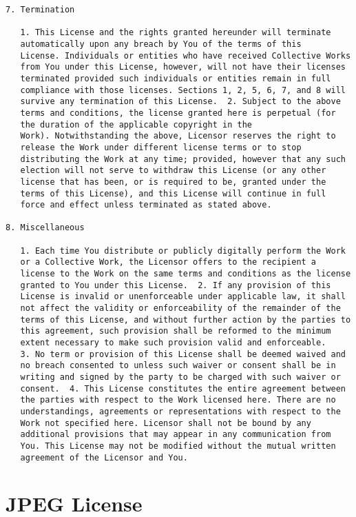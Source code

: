 \begin{lstlisting}[firstnumber=1,]
7. Termination

   1. This License and the rights granted hereunder will terminate
   automatically upon any breach by You of the terms of this
   License. Individuals or entities who have received Collective Works
   from You under this License, however, will not have their licenses
   terminated provided such individuals or entities remain in full
   compliance with those licenses. Sections 1, 2, 5, 6, 7, and 8 will
   survive any termination of this License.  2. Subject to the above
   terms and conditions, the license granted here is perpetual (for
   the duration of the applicable copyright in the
   Work). Notwithstanding the above, Licensor reserves the right to
   release the Work under different license terms or to stop
   distributing the Work at any time; provided, however that any such
   election will not serve to withdraw this License (or any other
   license that has been, or is required to be, granted under the
   terms of this License), and this License will continue in full
   force and effect unless terminated as stated above.

8. Miscellaneous

   1. Each time You distribute or publicly digitally perform the Work
   or a Collective Work, the Licensor offers to the recipient a
   license to the Work on the same terms and conditions as the license
   granted to You under this License.  2. If any provision of this
   License is invalid or unenforceable under applicable law, it shall
   not affect the validity or enforceability of the remainder of the
   terms of this License, and without further action by the parties to
   this agreement, such provision shall be reformed to the minimum
   extent necessary to make such provision valid and enforceable.
   3. No term or provision of this License shall be deemed waived and
   no breach consented to unless such waiver or consent shall be in
   writing and signed by the party to be charged with such waiver or
   consent.  4. This License constitutes the entire agreement between
   the parties with respect to the Work licensed here. There are no
   understandings, agreements or representations with respect to the
   Work not specified here. Licensor shall not be bound by any
   additional provisions that may appear in any communication from
   You. This License may not be modified without the mutual written
   agreement of the Licensor and You.

\end{lstlisting}
\section{JPEG License}
\label{webots.jpeglicense}%

